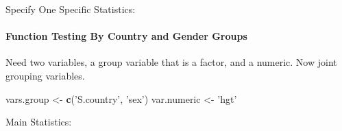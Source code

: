 \documentclass[
]{book}
\newenvironment{Shaded}{\begin{snugshade}}{\end{snugshade}}
\newcommand{\DataTypeTok}[1]{\textcolor[rgb]{0.13,0.29,0.53}{#1}}
\newcommand{\KeywordTok}[1]{\textcolor[rgb]{0.13,0.29,0.53}{\textbf{#1}}}
\newcommand{\NormalTok}[1]{#1}
\newcommand{\OperatorTok}[1]{\textcolor[rgb]{0.81,0.36,0.00}{\textbf{#1}}}
\newcommand{\StringTok}[1]{\textcolor[rgb]{0.31,0.60,0.02}{#1}}
\begin{document}
Specify One Specific Statistics:

\begin{Shaded}
\end{Shaded}

\hypertarget{function-testing-by-country-and-gender-groups}{%
\paragraph{Function Testing By Country and Gender Groups}\label{function-testing-by-country-and-gender-groups}}

Need two variables, a group variable that is a factor, and a numeric. Now joint grouping variables.

\begin{Shaded}
\begin{Highlighting}[]
\NormalTok{vars.group <-}\StringTok{ }\KeywordTok{c}\NormalTok{(}\StringTok{'S.country'}\NormalTok{, }\StringTok{'sex'}\NormalTok{)}
\NormalTok{var.numeric <-}\StringTok{ 'hgt'}
\end{Highlighting}
\end{Shaded}

\begin{Shaded}
\end{Shaded}

Main Statistics:

\begin{Shaded}
\end{Shaded}
\end{document}

